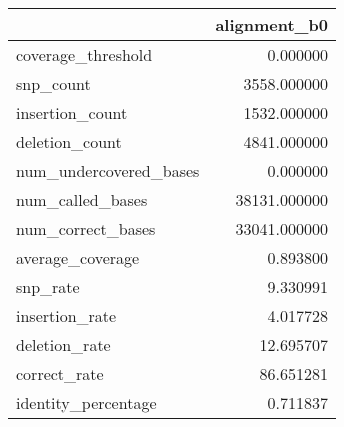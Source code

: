 \begin{tabular}{lr}
\toprule
{} &  alignment\_b0 \\
\midrule
coverage\_threshold     &      0.000000 \\
snp\_count              &   3558.000000 \\
insertion\_count        &   1532.000000 \\
deletion\_count         &   4841.000000 \\
num\_undercovered\_bases &      0.000000 \\
num\_called\_bases       &  38131.000000 \\
num\_correct\_bases      &  33041.000000 \\
average\_coverage       &      0.893800 \\
snp\_rate               &      9.330991 \\
insertion\_rate         &      4.017728 \\
deletion\_rate          &     12.695707 \\
correct\_rate           &     86.651281 \\
identity\_percentage    &      0.711837 \\
\bottomrule
\end{tabular}
